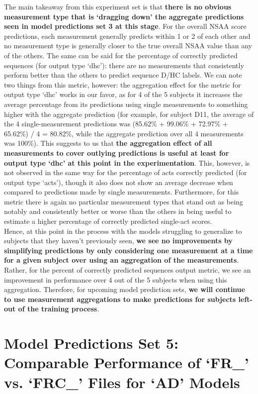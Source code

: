 \documentclass[12pt,twoside]{report}
\begin{document}
\quad The main takeaway from this experiment set is that \textbf{there is no obvious measurement type that is ‘dragging down’ the aggregate predictions seen in model predictions set 3 at this stage}. For the overall NSAA score predictions, each measurement generally predicts within 1 or 2 of each other and no measurement type is generally closer to the true overall NSAA value than any of the others. The same can be said for the percentage of correctly predicted sequences (for output type ‘dhc’): there are no measurements that consistently perform better than the others to predict sequence D/HC labels. We can note two things from this metric, however: the aggregation effect for the metric for output type ‘dhc’ works in our favor, as for 4 of the 5 subjects it increases the average percentage from its predictions using single measurements to something higher with the aggregate prediction (for example, for subject D11, the average of the 4 single-measurement predictions was (85.62\% + 99.06\% + 72.97\% + 65.62\%) / 4 = 80.82\%, while the aggregate prediction over all 4 measurements was 100\%). This suggests to us that \textbf{the aggregation effect of all measurements to cover outlying predictions is useful at least for output type ‘dhc’ at this point in the experimentation}. This, however, is not observed in the same way for the percentage of acts correctly predicted (for output type ‘acts’), though it also does not show an average decrease when compared to predictions made by single measurements. Furthermore, for this metric there is again no particular measurement types that stand out as being notably and consistently better or worse than the others in being useful to estimate a higher percentage of correctly predicted single-act scores.\\

\quad Hence, at this point in the process with the models struggling to generalize to subjects that they haven’t previously seen, \textbf{we see no improvements by simplifying predictions by only considering one measurement at a time for a given subject over using an aggregation of the measurements}. Rather, for the percent of correctly predicted sequences output metric, we see an improvement in performance over 4 out of the 5 subjects when using this aggregation. Therefore, for upcoming model prediction sets, \textbf{we will continue to use measurement aggregations to make predictions for subjects left-out of the training process}.



\section{Model Predictions Set 5: Comparable Performance of ‘FR\_’ vs. ‘FRC\_’ Files for ‘AD’ Models}
\end{document}
